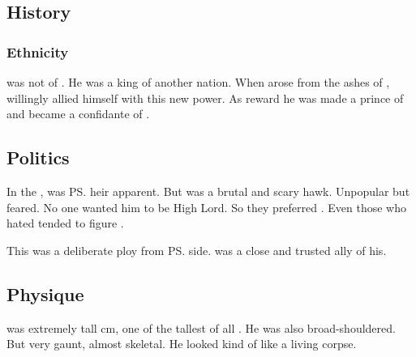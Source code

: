








\subsection{History}





\subsubsection{Ethnicity}
\Harbeth was not of \Merkyrah.
He was a king of another \resphan nation.
When \CiriathSepher arose from the ashes of \Merkyrah, \Harbeth willingly allied himself with this new power. 
As reward he was made a prince of \CiriathSepher and became a confidante of \Azraid. 









\subsection{Politics}
In the , \Harbeth{} was \ps{\Azraid} heir apparent. 
But \Harbeth{} was a brutal and scary hawk. 
Unpopular but feared. 
No one wanted him to be High Lord. 
So they preferred \Azraid. 
Even those who hated \Azraid{} tended to figure . 

This was a deliberate ploy from \ps{\Azraid} side. 
\Harbeth{} was a close and trusted ally of his. 









\subsection{Physique}
\Harbeth{} was extremely tall cm, one of the tallest of all \resphain.
He was also broad-shouldered.
But very gaunt, almost skeletal. 
He looked kind of like a living corpse. 

